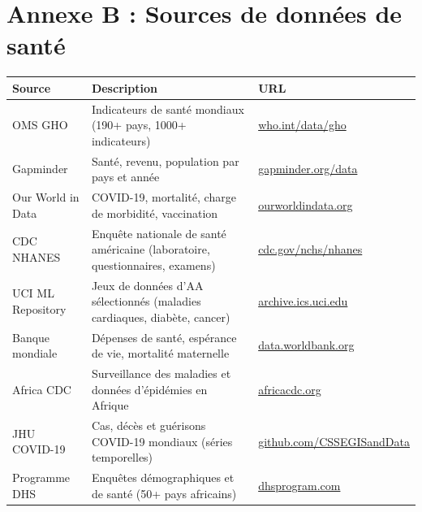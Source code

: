 \documentclass[12pt,a4paper,twoside]{book}
\begin{document}
\chapter*{Annexe B : Sources de donn\'ees de sant\'e}

\begin{longtable}{p{4cm}p{8cm}p{3cm}}
\toprule
\textbf{Source} & \textbf{Description} & \textbf{URL} \\
\midrule
OMS GHO & Indicateurs de sant\'e mondiaux (190+ pays, 1000+ indicateurs) & \url{who.int/data/gho} \\
Gapminder & Sant\'e, revenu, population par pays et ann\'ee & \url{gapminder.org/data} \\
Our World in Data & COVID-19, mortalit\'e, charge de morbidit\'e, vaccination & \url{ourworldindata.org} \\
CDC NHANES & Enqu\^ete nationale de sant\'e am\'ericaine (laboratoire, questionnaires, examens) & \url{cdc.gov/nchs/nhanes} \\
UCI ML Repository & Jeux de donn\'ees d'AA s\'electionn\'es (maladies cardiaques, diab\`ete, cancer) & \url{archive.ics.uci.edu} \\
Banque mondiale & D\'epenses de sant\'e, esp\'erance de vie, mortalit\'e maternelle & \url{data.worldbank.org} \\
Africa CDC & Surveillance des maladies et donn\'ees d'\'epid\'emies en Afrique & \url{africacdc.org} \\
JHU COVID-19 & Cas, d\'ec\`es et gu\'erisons COVID-19 mondiaux (s\'eries temporelles) & \url{github.com/CSSEGISandData} \\
Programme DHS & Enqu\^etes d\'emographiques et de sant\'e (50+ pays africains) & \url{dhsprogram.com} \\
\bottomrule
\end{longtable}




\printindex
\end{document}
